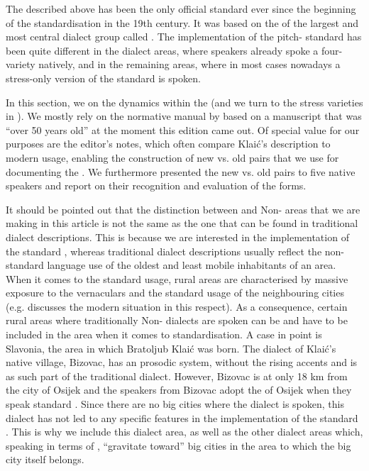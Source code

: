 \documentclass[output=paper,nonflat,colorlinks,citecolor=brown,newtxmath]{langsci/langscibook}
\begin{document}
The  described above has been the only official standard ever since the beginning of the standardisation in the 19th century. It was based on the  of the largest and most central dialect group called . The implementation of the pitch- standard has been quite different in the  dialect areas, where speakers already spoke a four- variety natively, and in the remaining areas, where in most cases nowadays a stress-only version of the standard is spoken.

In this section, we  on the dynamics within the   (and we turn to the stress varieties in ). We mostly rely on the normative manual by \citet[]{Klaic2013} based on a manuscript that was ``over 50 years old'' at the moment this edition came out. Of special value for our purposes are the editor's notes, which often compare Klaić's description to modern usage, enabling the construction of new vs. old pairs that we use for documenting the . We furthermore presented the new vs. old pairs to five native speakers and report on their recognition and evaluation of the forms.

It should be pointed out that the distinction between  and Non- areas that we are making in this article is not the same as the one that can be found in traditional dialect descriptions. This is because we are interested in the implementation of the standard  , whereas traditional dialect descriptions usually reflect the non-standard language use of the oldest and least mobile inhabitants of an area. When it comes to the standard usage, rural areas are characterised by massive exposure to the vernaculars and the standard usage of the neighbouring cities (e.g. \citealt{Kapović2004} discusses the modern  situation in this respect). As a consequence, certain rural areas where traditionally Non- dialects are spoken can be and have to be included in the  area when it comes to standardisation. A case in point is Slavonia, the area in which Bratoljub Klaić was born. The dialect of Klaić's native village, Bizovac, has an  prosodic system, without the  rising accents \citep[19]{Klaic2007} and is as such part of the traditional   dialect. However, Bizovac is at only 18 km from the  city of Osijek and the speakers from Bizovac adopt the  of Osijek when they speak standard . Since there are no big cities where the  dialect is spoken, this dialect has not led to any specific features in the implementation of the standard . This is why we include this dialect area, as well as the other dialect areas which, speaking in terms of \citet{Kapović2004}, ``gravitate toward'' big cities in the area to which the big city itself belongs.
\end{document}

